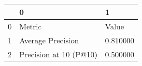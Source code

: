 \begin{tabular}{lll}
\toprule
 & 0 & 1 \\
\midrule
0 & Metric & Value \\
1 & Average Precision & 0.810000 \\
2 & Precision at 10 (P@10) & 0.500000 \\
\bottomrule
\end{tabular}
